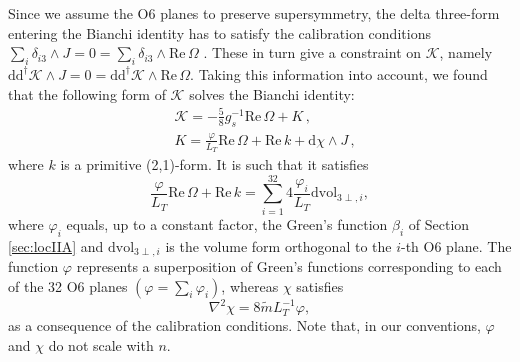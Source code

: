 \documentclass[11pt]{article}
\newcommand{\be}{\begin{equation}}
\newcommand{\ee}{\end{equation}}
\def\be{\begin{equation}}
\def\ee{\end{equation}}
\renewcommand{\[}{\left[}
\renewcommand{\]}{\right]}
\renewcommand{\(}{\left(}
\renewcommand{\)}{\right)}
\renewcommand{\Re}{\text{Re}\,}
\newcommand{\dd}{\mathrm{d}}
\newcommand{\<}{\langle}
\renewcommand{\>}{\rangle}
\begin{document}
Since we assume the O6 planes to preserve supersymmetry, the delta three-form entering the Bianchi identity has to satisfy the calibration conditions $\sum_i\delta_{i3} \wedge J = 0 = \sum_i\delta_{i3} \wedge \Re \Omega$ \cite{Acharya:2006ne}. These in turn give a constraint on $\mathcal{K}$, namely $\dd \dd^\dagger \mathcal{K} \wedge J = 0 = \dd \dd^\dagger \mathcal{K} \wedge \Re \Omega $. Taking this information into account, we found that the following form of $\mathcal{K}$ solves the Bianchi identity:
\begin{align}
\label{eq:curlyK}
& \mathcal{K} = -\frac{5}{8}g_s^{-1} \Re \Omega + K\,,\\
& K = \frac{{\varphi} }{L_T}\Re \Omega + \Re k  + \dd {\chi } \wedge J\,,
\end{align}
where $k$ is a primitive (2,1)-form. It is such that it satisfies
\begin{equation}
 \frac{{\varphi} }{L_T}\Re \Omega + \Re k = \sum_{i=1}^{32}  4\frac{\varphi_i}{L_T} \text{dvol}_{3\perp,i},
\end{equation} 
where $\varphi_i$ equals, up to a constant factor, the Green's function $\beta_i$ of Section \ref{sec:locIIA} and $\text{dvol}_{3\perp,i}$ is the volume form orthogonal to the $i$-th O6 plane. The function ${\varphi}$ represents a superposition of Green's functions corresponding to each of the 32 O6 planes $({\varphi} = \sum_i \varphi_i)$, whereas ${\chi}$ satisfies 
\be
\nabla^2 \chi =  8 \tilde{m} L_T^{-1} \varphi,
\ee
as a consequence of the calibration conditions. Note that, in our conventions, $\varphi$ and $\chi$ do not scale with $n$.
\end{document}

